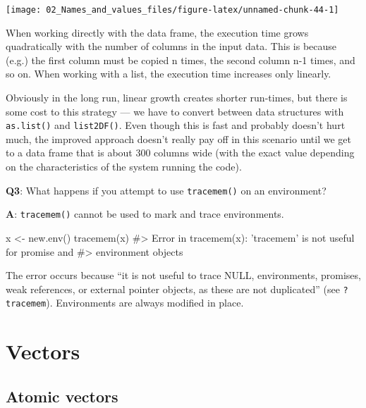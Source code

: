 \documentclass[
]{krantz}
\makeatletter
\newenvironment{Shaded}{\begin{snugshade}}{\end{snugshade}}
\newcommand{\CommentTok}[1]{\textcolor[rgb]{0.56,0.35,0.01}{\textit{#1}}}
\newcommand{\KeywordTok}[1]{\textcolor[rgb]{0.13,0.29,0.53}{\textbf{#1}}}
\newcommand{\NormalTok}[1]{#1}
\newcommand{\StringTok}[1]{\textcolor[rgb]{0.31,0.60,0.02}{#1}}
\newenvironment{kframe}{%
\medskip{}
\setlength{\fboxsep}{.8em}
 \def\at@end@of@kframe{}%
 \ifinner\ifhmode%
  \def\at@end@of@kframe{\end{minipage}}%
  \begin{minipage}{\columnwidth}%
 \fi\fi%
 \def\FrameCommand##1{\hskip\@totalleftmargin \hskip-\fboxsep
 \colorbox{shadecolor}{##1}\hskip-\fboxsep
     \hskip-\linewidth \hskip-\@totalleftmargin \hskip\columnwidth}%
 \MakeFramed {\advance\hsize-\width
   \@totalleftmargin\z@ \linewidth\hsize
   \@setminipage}}%
 {\par\unskip\endMakeFramed%
 \at@end@of@kframe}
\renewenvironment{Shaded}{\begin{kframe}}{\end{kframe}}
\renewcommand{\KeywordTok} [1]{\textcolor[rgb]{0.00,0.44,0.13}{{#1}}}
\renewcommand{\StringTok}  [1]{\textcolor[rgb]{0.25,0.44,0.63}{{#1}}}
\renewcommand{\CommentTok} [1]{\textcolor[rgb]{0.38,0.63,0.69}{{#1}}}
\renewcommand{\NormalTok}  [1]{{#1}}
\makeatother
\begin{document}
\begin{center}\texttt{[image: 02\_Names\_and\_values\_files/figure-latex/unnamed-chunk-44-1]} \end{center}

When working directly with the data frame, the execution time grows quadratically with the number of columns in the input data. This is because (e.g.) the first column must be copied n times, the second column n-1 times, and so on. When working with a list, the execution time increases only linearly.

Obviously in the long run, linear growth creates shorter run-times, but there is some cost to this strategy --- we have to convert between data structures with \texttt{as.list()} and \texttt{list2DF()}. Even though this is fast and probably doesn't hurt much, the improved approach doesn't really pay off in this scenario until we get to a data frame that is about 300 columns wide (with the exact value depending on the characteristics of the system running the code).

\textbf{{Q3}}: What happens if you attempt to use \texttt{tracemem()} on an environment?

\textbf{{A}}: \texttt{tracemem()} cannot be used to mark and trace environments.

\begin{Shaded}
\begin{Highlighting}[]
\NormalTok{x <-}\StringTok{ }\KeywordTok{new.env}\NormalTok{()}
\KeywordTok{tracemem}\NormalTok{(x)}
\CommentTok{#> Error in tracemem(x): 'tracemem' is not useful for promise and}
\CommentTok{#> environment objects}
\end{Highlighting}
\end{Shaded}

The error occurs because ``it is not useful to trace NULL, environments, promises, weak references, or external pointer objects, as these are not duplicated'' (see \texttt{?tracemem}). Environments are always modified in place.

\hypertarget{vectors}{%
\chapter{Vectors}\label{vectors}}


\hypertarget{atomic-vectors}{%
\section{Atomic vectors}\label{atomic-vectors}}
\end{document}
